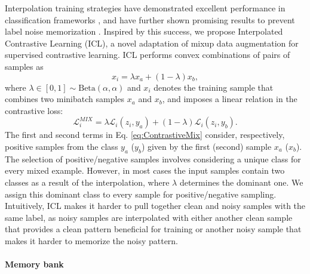 \documentclass[final]{cvpr}
\begin{document}
Interpolation training strategies have demonstrated excellent performance
in classification frameworks \cite{2018_ICLR_mixup,2018_ACMl_RICAP,2019_ICCV_CutMix}, and have further shown promising results to prevent label noise memorization \cite{2018_ICLR_mixup,2019_ICML_DynamicBootstrapping,2020_ICLR_DivideMix,2020_ICML_DatasetOOD}. Inspired by this success, we propose Interpolated Contrastive Learning (ICL), a novel adaptation of mixup data augmentation \cite{2018_ICLR_mixup} for supervised contrastive learning. ICL performs convex combinations of pairs of samples as
\begin{equation} x_{i}=\lambda x_{a}+\left(1-\lambda\right)x_{b},\label{eq:MixupInput} \end{equation}
where $\lambda\in\left[0,1\right]\sim \mathrm{Beta}\left(\alpha,\alpha\right)$ and $x_{i}$ denotes the training sample that combines two minibatch samples $x_{a}$ and $x_{b}$, and imposes a linear relation in the contrastive loss:  
\begin{equation}
\mathcal{L}_{i}^{\mathit{MIX}}=\lambda\mathcal{L}_{i}\left(z_{i},y_{a}\right)+\left(1-\lambda\right)\mathcal{L}_{i}\left(z_{i},y_{b}\right).\label{eq:ContrastiveMix}
\end{equation}
The first and second terms in Eq. \ref{eq:ContrastiveMix} consider, respectively, positive samples from the class $y_{a}$ ($y_{b}$) given by the first (second) sample $x_{a}$ ($x_{b}$). The selection of positive/negative samples involves considering a unique class for every mixed example. However, in most cases the input samples contain two classes as a result of the interpolation, where $\lambda$ determines the dominant one. We assign this dominant class to every sample for positive/negative sampling. Intuitively, ICL makes it harder to pull together clean and noisy samples with the same label, as noisy samples are interpolated with either another clean sample that provides a
clean pattern beneficial for training or another noisy sample that makes it harder to memorize the noisy pattern. 

\paragraph{Memory bank}
\end{document}
